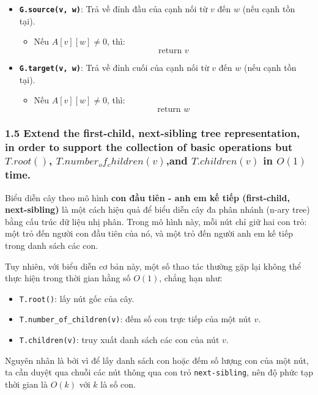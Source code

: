 \documentclass{article}
\begin{document}
\begin{itemize}
		\item \textbf{\texttt{G.source(v, w)}}: Trả về đỉnh đầu của cạnh nối từ $v$ đến $w$ (nếu cạnh tồn tại).
		
		\begin{itemize}
			\item Nếu $A[v][w] \ne 0$, thì:
			\[
			\text{return } v
			\]
		\end{itemize}
		
		\item \textbf{\texttt{G.target(v, w)}}: Trả về đỉnh cuối của cạnh nối từ $v$ đến $w$ (nếu cạnh tồn tại).
		
		\begin{itemize}
			\item Nếu $A[v][w] \ne 0$, thì:
			\[
			\text{return } w
			\]
		\end{itemize}
		
	\end{itemize}
	
	\subsubsection*{1.5 Extend the first-child, next-sibling tree representation, in order to support the collection of basic operations but $T.root()$, $T.number_of_children(v)$,and $T.children(v)$ in $O(1)$ time.}
	
	Biểu diễn cây theo mô hình \textbf{con đầu tiên - anh em kế tiếp (first-child, next-sibling)} là một cách hiệu quả để biểu diễn cây đa phân nhánh (n-ary tree) bằng cấu trúc dữ liệu nhị phân. Trong mô hình này, mỗi nút chỉ giữ hai con trỏ: một trỏ đến người con đầu tiên của nó, và một trỏ đến người anh em kế tiếp trong danh sách các con.
	
	Tuy nhiên, với biểu diễn cơ bản này, một số thao tác thường gặp lại không thể thực hiện trong thời gian hằng số $O(1)$, chẳng hạn như:
	
	\begin{itemize}
		\item \texttt{T.root()}: lấy nút gốc của cây.
		\item \texttt{T.number\_of\_children(v)}: đếm số con trực tiếp của một nút $v$.
		\item \texttt{T.children(v)}: truy xuất danh sách các con của nút $v$.
	\end{itemize}
	
	Nguyên nhân là bởi vì để lấy danh sách con hoặc đếm số lượng con của một nút, ta cần duyệt qua chuỗi các nút thông qua con trỏ \texttt{next-sibling}, nên độ phức tạp thời gian là $O(k)$ với $k$ là số con.
	
\end{document}
